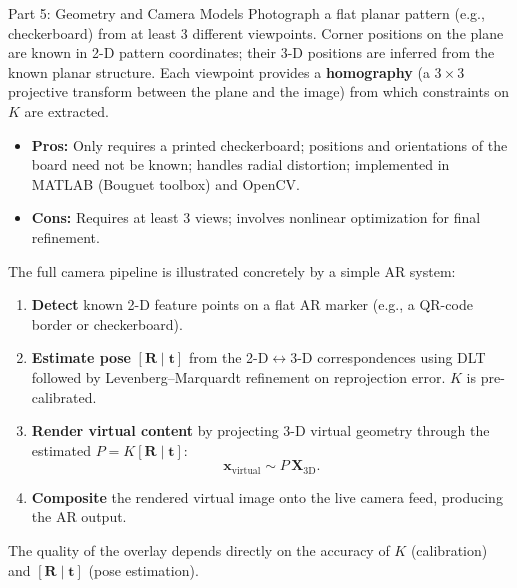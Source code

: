 \documentclass[letterpaper]{article}
\begin{document}
\begin{notes}{Part 5: Geometry and Camera Models}
Photograph a flat planar pattern (e.g., checkerboard) from at least 3
different viewpoints.  Corner positions on the plane are known in 2-D
pattern coordinates; their 3-D positions are inferred from the known
planar structure.  Each viewpoint provides a \textbf{homography} (a
$3\times 3$ projective transform between the plane and the image) from
which constraints on $K$ are extracted.
\begin{itemize}[noitemsep]
  \item \textbf{Pros:} Only requires a printed checkerboard; positions
        and orientations of the board need not be known; handles radial
        distortion; implemented in MATLAB (Bouguet toolbox) and OpenCV.
  \item \textbf{Cons:} Requires at least 3 views; involves nonlinear
        optimization for final refinement.
\end{itemize}


The full camera pipeline is illustrated concretely by a simple AR system:
\begin{enumerate}[noitemsep]
  \item \textbf{Detect} known 2-D feature points on a flat AR marker
        (e.g., a QR-code border or checkerboard).
  \item \textbf{Estimate pose} $[\mathbf{R}\mid\mathbf{t}]$ from the
        2-D$\leftrightarrow$3-D correspondences using DLT followed by
        Levenberg--Marquardt refinement on reprojection error.  $K$ is
        pre-calibrated.
  \item \textbf{Render virtual content} by projecting 3-D virtual geometry
        through the estimated $P = K[\mathbf{R}\mid\mathbf{t}]$:
        \[
          \mathbf{x}_{\text{virtual}} \sim P\,\mathbf{X}_{\text{3D}}.
        \]
  \item \textbf{Composite} the rendered virtual image onto the live camera
        feed, producing the AR output.
\end{enumerate}
The quality of the overlay depends directly on the accuracy of $K$
(calibration) and $[\mathbf{R}\mid\mathbf{t}]$ (pose estimation).





\end{notes}
\end{document}

